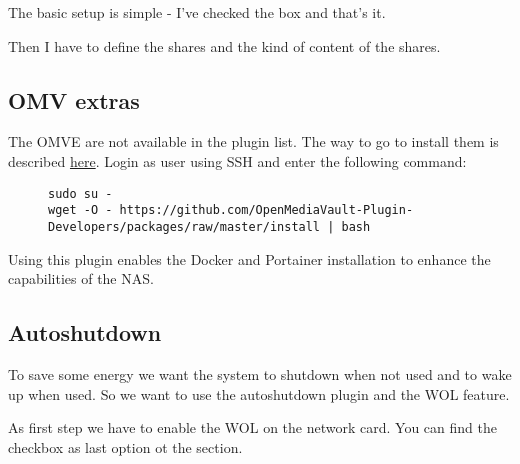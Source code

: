 The basic setup is simple - I've checked the  box and that's
it.


Then I have to define the shares and the kind of content of the shares.


\subsection{OMV extras}

The \gls{OMVE} are not available in the plugin list. The way to go to install
them is described \href{https://forum.openmediavault.org/index.php?thread/39594-omvextras-for-omv6/}{here}.
Login as user  using SSH and enter the following command:

\begin{figure}[H]
    \centering
    \begin{tiny}
        \begin{BVerbatim}
sudo su -
wget -O - https://github.com/OpenMediaVault-Plugin-Developers/packages/raw/master/install | bash
        \end{BVerbatim}
    \end{tiny}
\end{figure}

Using this plugin enables the \gls{Docker} and \gls{Portainer} installation
to enhance the capabilities of the \gls{NAS}.


\subsection{Autoshutdown}

To save some energy we want the system to shutdown when not used and to wake up
when used. So we want to use the autoshutdown plugin and the \gls{WOL} feature.


As first step we have to enable the \gls{WOL} on the network card. You can find
the checkbox as last option ot the  section.


